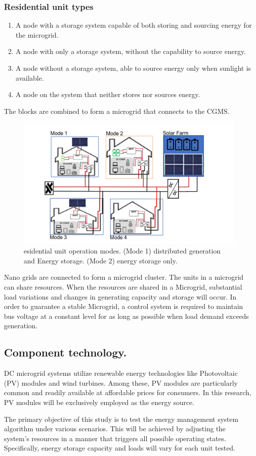 \subsubsection{Residential unit types}
\begin{enumerate}[nolistsep]
	\item A node with a storage system capable of both storing and sourcing energy for the microgrid.
	\item A node with only a storage system, without the capability to source energy.
	\item A node without a storage system, able to source energy only when sunlight is available.
	\item A node on the system that neither stores nor sources energy.
\end{enumerate}

The blocks are combined to form a microgrid that connects to the CGMS.
\begin{figure}[H]
	\centering
	\includegraphics[totalheight=8cm]{Figures/re dc mg.png}
	\caption{esidential unit operation modes. (Mode 1) distributed generation and Energy storage. (Mode 2) energy storage only.}
\end{figure}
Nano grids are connected to form a microgrid cluster. The units in a microgrid can share resources. When the resources are shared in a Microgrid, substantial load variations and changes in generating capacity and storage will occur. In order to guarantee a stable Microgrid, a control system is required to maintain bus voltage at a constant level for as long as possible when load demand exceeds generation.

\subsection{Component technology.}
DC microgrid systems utilize renewable energy technologies like Photovoltaic (PV) modules and wind turbines. Among these, PV modules are particularly common and readily available at affordable prices for consumers. In this research, PV modules will be exclusively employed as the energy source.\par
The primary objective of this study is to test the energy management system algorithm under various scenarios. This will be achieved by adjusting the system's resources in a manner that triggers all possible operating states. Specifically, energy storage capacity and loads will vary for each unit tested.\par

